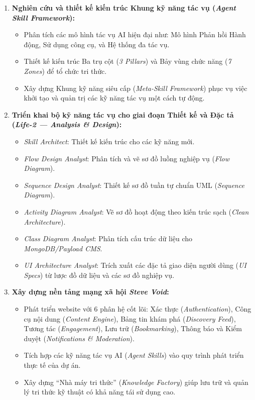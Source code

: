 \documentclass[13pt,a4paper,oneside]{extreport}
\numberwithin{equation}{chapter}
\numberwithin{figure}{chapter}
\numberwithin{table}{chapter}
\begin{document}
\begin{enumerate}
    \item \textbf{Nghiên cứu và thiết kế kiến trúc Khung kỹ năng tác vụ (\textit{Agent Skill Framework}):}
    \begin{itemize}
        \item Phân tích các mô hình tác vụ AI hiện đại như: Mô hình Phản hồi Hành động, Sử dụng công cụ, và Hệ thống đa tác vụ.
        \item Thiết kế kiến trúc Ba trụ cột (\textit{3 Pillars}) và Bảy vùng chức năng (\textit{7 Zones}) để tổ chức tri thức.
        \item Xây dựng Khung kỹ năng siêu cấp (\textit{Meta-Skill Framework}) phục vụ việc khởi tạo và quản trị các kỹ năng tác vụ một cách tự động.
    \end{itemize}

    \item \textbf{Triển khai bộ kỹ năng tác vụ cho giai đoạn Thiết kế và Đặc tả (\textit{Life-2 — Analysis \& Design}):}
    \begin{itemize}
        \item \textit{Skill Architect}: Thiết kế kiến trúc cho các kỹ năng mới.
        \item \textit{Flow Design Analyst}: Phân tích và vẽ sơ đồ luồng nghiệp vụ (\textit{Flow Diagram}).
        \item \textit{Sequence Design Analyst}: Thiết kế sơ đồ tuần tự chuẩn UML (\textit{Sequence Diagram}).
        \item \textit{Activity Diagram Analyst}: Vẽ sơ đồ hoạt động theo kiến trúc sạch (\textit{Clean Architecture}).
        \item \textit{Class Diagram Analyst}: Phân tích cấu trúc dữ liệu cho \textit{MongoDB/Payload CMS}.
        \item \textit{UI Architecture Analyst}: Trích xuất các đặc tả giao diện người dùng (\textit{UI Specs}) từ lược đồ dữ liệu và các sơ đồ nghiệp vụ.
    \end{itemize}

    \item \textbf{Xây dựng nền tảng mạng xã hội \textit{Steve Void}:}
    \begin{itemize}
        \item Phát triển website với 6 phân hệ cốt lõi: Xác thực (\textit{Authentication}), Công cụ nội dung (\textit{Content Engine}), Bảng tin khám phá (\textit{Discovery Feed}), Tương tác (\textit{Engagement}), Lưu trữ (\textit{Bookmarking}), Thông báo và Kiểm duyệt (\textit{Notifications \& Moderation}).
        \item Tích hợp các kỹ năng tác vụ AI (\textit{Agent Skills}) vào quy trình phát triển thực tế của dự án.
        \item Xây dựng “Nhà máy tri thức” (\textit{Knowledge Factory}) giúp lưu trữ và quản lý tri thức kỹ thuật có khả năng tái sử dụng cao.
    \end{itemize}


\end{enumerate}
\end{document}
